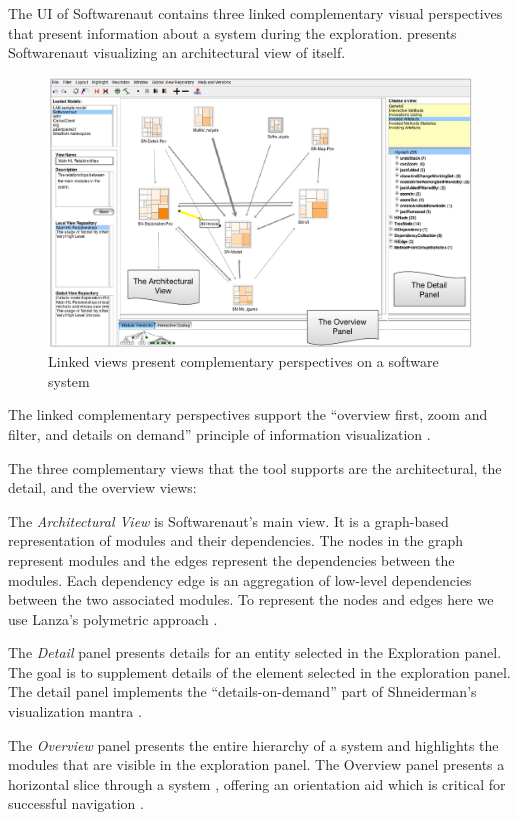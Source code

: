 \documentclass[preprint,12pt]{elsarticle}
\begin{document}
The UI of Softwarenaut contains three linked complementary visual perspectives that present information about a system during the exploration.  presents Softwarenaut visualizing an architectural view of itself. 

\begin{figure}[ht]
\begin{center}
\includegraphics[width=\linewidth]{SnautOnSnaut.pdf}
\caption{Linked views present complementary perspectives on a software system }
\end{center}
\end{figure}

The linked complementary perspectives support the ``overview first, zoom and filter, and details on demand'' principle of information visualization \cite{shneid-eyes}. 

The three complementary views that the tool supports are the architectural, the detail, and the overview views:

\begin{description}

\item The {\em Architectural View} is Softwarenaut's main view. It is a graph-based representation of modules and their dependencies. The nodes in the graph represent modules and the edges represent the dependencies between the modules. Each dependency edge is an aggregation of low-level dependencies between the two associated modules. To represent the nodes and edges here we use Lanza's polymetric approach \cite{lanza-pv, lanza-oomp}. 

\item The {\em Detail} panel presents details for an entity selected in the Exploration panel. The goal is to supplement details of the element selected in the exploration panel. The detail panel implements the ``details-on-demand'' part of Shneiderman's visualization mantra \cite{shneid-eyes}.

\item The {\em Overview} panel presents the entire hierarchy of a system and highlights the modules that are visible in the exploration panel. The Overview panel presents a horizontal slice through a system \cite{wong-thesis}, offering an orientation aid which is critical for successful navigation \cite{storey-awareness}.

\end{description}
\end{document}
